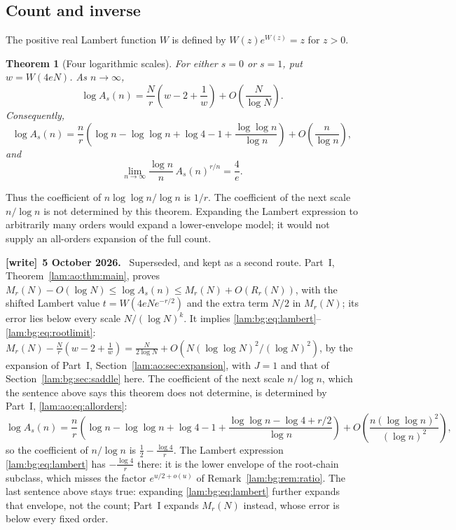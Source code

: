 \documentclass[11pt,a4paper]{article}
\numberwithin{equation}{section}
\newtheorem{theorem}{Theorem}[section]
\theoremstyle{remark}
\newenvironment{writenote}[1][]{\par\smallskip\begingroup\small
 \noindent\textbf{[write]}\if\relax\detokenize{#1}\relax\else~\textbf{#1.}\fi\ }%
 {\par\endgroup\smallskip}
\begin{document}
\subsection{Count and inverse}
The positive real Lambert function $W$ is defined by $W(z)e^{W(z)}=z$ for $z>0$.
\begin{theorem}[Four logarithmic scales]\label{lam:bg:thm:count}
For either $s=0$ or $s=1$, put $w=W(4eN)$. As $n\to\infty$,
\begin{equation}\label{lam:bg:eq:lambert}
 \log A_s(n)=\frac Nr\left(w-2+\frac1w\right)
                  +O\!\left(\frac N{\log N}\right).
\end{equation}
Consequently,
\begin{equation}\label{lam:bg:eq:four}
 \log A_s(n)=\frac nr\left(\log n-\log\log n+\log4-1
          +\frac{\log\log n}{\log n}\right)
                +O\!\left(\frac n{\log n}\right),
\end{equation}
and
\begin{equation}\label{lam:bg:eq:rootlimit}
 \lim_{n\to\infty}\frac{\log n}{n}\,A_s(n)^{r/n}=\frac4e.
\end{equation}
\end{theorem}
Thus the coefficient of $n\log\log n/\log n$ is $1/r$. The coefficient of the next scale $n/\log n$ is not determined by this theorem. Expanding the Lambert expression to arbitrarily many orders would expand a lower-envelope model; it would not supply an all-orders expansion of the full count.
\begin{writenote}[5 October 2026]
Superseded, and kept as a second route. Part~I, Theorem~\ref{lam:ao:thm:main}, proves $M_r(N)-O(\log N)\le\log A_s(n)\le M_r(N)+O(R_r(N))$, with the shifted Lambert value $t=W(4eNe^{-r/2})$ and the extra term $N/2$ in $M_r(N)$; its error lies below every scale $N/(\log N)^k$. It implies \eqref{lam:bg:eq:lambert}--\eqref{lam:bg:eq:rootlimit}: $M_r(N)-\frac Nr(w-2+\frac1w)=\frac N{2\log N}+O(N(\log\log N)^2/(\log N)^2)$, by the expansion of Part~I, Section~\ref{lam:ao:sec:expansion}, with $J=1$ and that of Section~\ref{lam:bg:sec:saddle} here. The coefficient of the next scale $n/\log n$, which the sentence above says this theorem does not determine, is determined by Part~I, \eqref{lam:ao:eq:allorders}:
\[
 \log A_s(n)=\frac nr\left(\log n-\log\log n+\log4-1+\frac{\log\log n-\log4+r/2}{\log n}\right)+O\!\left(\frac{n(\log\log n)^2}{(\log n)^2}\right),
\]
so the coefficient of $n/\log n$ is $\frac12-\frac{\log4}r$. The Lambert expression \eqref{lam:bg:eq:lambert} has $-\frac{\log4}r$ there: it is the lower envelope of the root-chain subclass, which misses the factor $e^{u/2+o(u)}$ of Remark~\ref{lam:bg:rem:ratio}. The last sentence above stays true: expanding \eqref{lam:bg:eq:lambert} further expands that envelope, not the count; Part~I expands $M_r(N)$ instead, whose error is below every fixed order.
\end{writenote}
\end{document}

